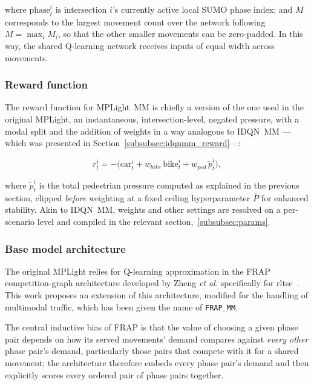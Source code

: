 \noindent where $\mathrm{phase}_t^i$ is intersection $i$'s currently active local SUMO phase index; and $M$ corresponds to the largest movement count over the network following $M = \max_i M_i$, so that the other smaller movements can be zero-padded. In this way, the shared Q-learning network receives inputs of equal width across movements.
 
\subsubsection{Reward function} \label{subsubsec:mp_reward}

The reward function for MPLight~MM is chiefly a version of the one used in the original MPLight, an instantaneous, intersection-level, negated pressure, with a modal split and the addition of weights in a way analogous to IDQN~MM —which was presented in Section~\ref{subsubsec:idqnmm_reward}—:
 
\begin{equation}
r_t^i = -\Big( \mathrm{car}_t^i + w_{bike}\, \mathrm{bike}_t^i + w_{ped}\, \tilde p_t^i \Big),
\end{equation}
 
\noindent where $\tilde p_t^i$  is the total pedestrian pressure computed as explained in the previous section,  clipped \emph{before} weighting at a fixed ceiling hyperparameter $\bar P$ for enhanced stability. Akin to IDQN~MM, weights and other settings are resolved on a per-scenario level and compiled in the relevant section,~\ref{subsubsec:params}.
 
\subsubsection{Base model architecture}
 
The original MPLight relies for Q-learning approximation in the FRAP competition-graph architecture developed by Zheng \textit{et al.} specifically for \gls{rltsc}~\cite{Zheng2019}. This work proposes an extension of this architecture, modified for the handling of multimodal traffic, which has been given the name of \texttt{FRAP\_MM}.

The central inductive bias of FRAP is that the value of choosing a given phase pair depends on how its served movements' demand compares against \textit{every other} phase pair's demand, particularly those pairs that compete with it for a shared movement; the architecture therefore embeds every phase pair's demand and then explicitly scores every ordered pair of phase pairs together.
 
